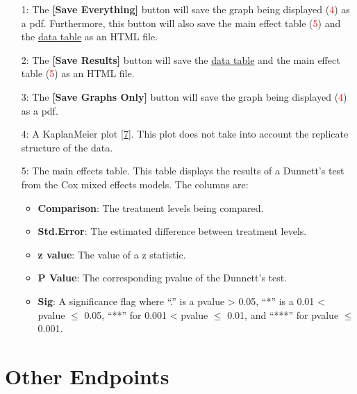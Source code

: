 \documentclass[a4paper]{article}
\begin{document}
\begin{enumerate}

\item[\begingroup\color{red}1:\endgroup] The \textbf{[Save Everything]} button will save the graph being displayed (\textcolor{red}{4})
	as a pdf. Furthermore, this button will also save the main effect table (\textcolor{red}{5}) and the \hyperlink{fig:Time2Event2}{data table} as an HTML file. 

\item[\begingroup\color{red}2:\endgroup] The \textbf{[Save Results]} button will save the 
	\hyperlink{fig:Time2Event2}{data table} and the main effect table (\textcolor{red}{5}) as an HTML file. 

\item[\begingroup\color{red}3:\endgroup] The \textbf{[Save Graphs Only]} button will save the graph being displayed (\textcolor{red}{4})
	as a pdf.
	
\item[\begingroup\color{red}4:\endgroup] A Kaplan\textendash{}Meier plot [\hyperlink{R7}{7}].  This plot does not take into account the replicate structure of the data.  

\item[\begingroup\color{red}5:\endgroup] The main effects table.  This table displays the results of a Dunnett's test from the Cox mixed effects models.  The columns are:
	\begin{itemize}
		\item \textbf{Comparison}: The treatment levels being compared.
		\item \textbf{Std.Error}:  The estimated difference between treatment levels.
		\item \textbf{z value}: The value of a z statistic.
		\item \textbf{P Value}: The corresponding p\textendash{}value of the Dunnett's test.
		\item \textbf{Sig}: A significance flag where ``.'' is a p\textendash{}value > 0.05, ``*'' is
			a 0.01 < p\textendash{}value $\leq$  0.05, ``**'' for 0.001 < p\textendash{}value $\leq$  0.01, and ``***'' for p\textendash{}value $\leq$  0.001.  	
	\end{itemize}

\end{enumerate}

 

\hypertarget{OtherEnd}{\section*{Other Endpoints}}
\label{sec:OtherEnd}
\label{subsec:OtherEndpointsMain}
\end{document}
